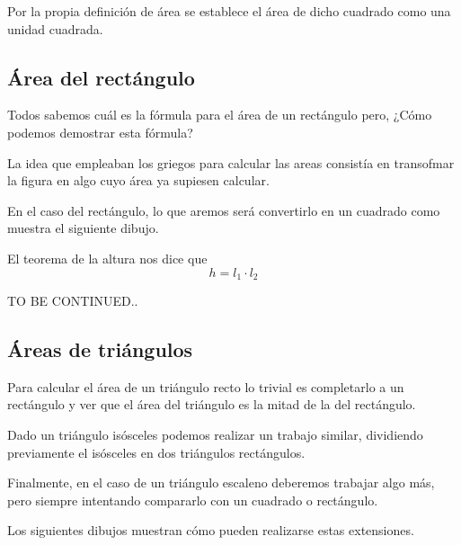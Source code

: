 \documentclass{apuntes}
\begin{document}
Por la propia definición de área se establece el área de dicho cuadrado como una unidad cuadrada.

\subsection{Área del rectángulo}

Todos sabemos cuál es la fórmula para el área de un rectángulo pero, ¿Cómo podemos demostrar esta fórmula?

La idea que empleaban los griegos para calcular las areas consistía en transofmar la figura en algo cuyo área ya supiesen calcular.

En el caso del rectángulo, lo que aremos será convertirlo en un cuadrado como muestra el siguiente dibujo.

\begin{minipage}{0.4\textwidth}
\begin{center}
\end{center}
\end{minipage}
\begin{minipage}{0.55\textwidth}
El teorema de la altura nos dice que 
\[h=l_1\cdot l_2\]

TO BE CONTINUED..
\end{minipage}

\subsection{Áreas de triángulos}

Para calcular el área de un triángulo recto lo trivial es completarlo a un rectángulo y ver que el área del triángulo es la mitad de la del rectángulo.

Dado un triángulo isósceles podemos realizar un trabajo similar, dividiendo previamente el isósceles en dos triángulos rectángulos.

Finalmente, en el caso de un triángulo escaleno deberemos trabajar algo más, pero siempre intentando compararlo con un cuadrado o rectángulo.

Los siguientes dibujos muestran cómo pueden realizarse estas extensiones.

\begin{minipage}{0.33\textwidth}
\begin{center}
\end{center}
\end{minipage}
\begin{minipage}{0.33\textwidth}
\begin{center}
\end{center}
\end{minipage}
\begin{minipage}{0.33\textwidth}
\begin{center}
\end{center}
\end{minipage}
\end{document}
